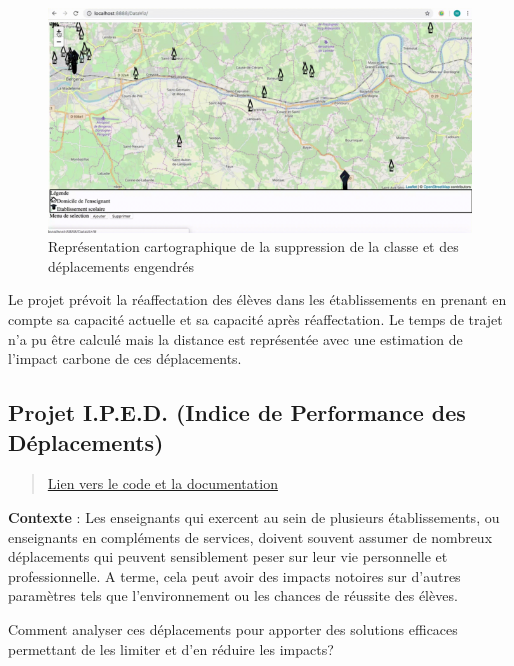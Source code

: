 \documentclass[]{book}
\begin{document}
\begin{figure}

{\centering \includegraphics[width=0.6\linewidth]{./img/locaviz} 

}

\caption{Représentation cartographique de la suppression de la classe et des déplacements engendrés}\label{fig:unnamed-chunk-5}
\end{figure}

Le projet prévoit la réaffectation des élèves dans les établissements en
prenant en compte sa capacité actuelle et sa capacité après
réaffectation. Le temps de trajet n'a pu être calculé mais la distance
est représentée avec une estimation de l'impact carbone de ces
déplacements.

\subsection{Projet I.P.E.D. (Indice de Performance des
Déplacements)}\label{projet-i.p.e.d.-indice-de-performance-des-deplacements}

\begin{quote}
\href{http://datavizchallenge.fr/t/defi-numero-1-indice-annuel-d-evaluation-de-l-impact-mobilite-des-enseignants/131}{Lien
vers le code et la documentation}
\end{quote}

\textbf{Contexte} : Les enseignants qui exercent au sein de plusieurs
établissements, ou enseignants en compléments de services, doivent
souvent assumer de nombreux déplacements qui peuvent sensiblement peser
sur leur vie personnelle et professionnelle. A terme, cela peut avoir
des impacts notoires sur d'autres paramètres tels que l'environnement ou
les chances de réussite des élèves.

Comment analyser ces déplacements pour apporter des solutions efficaces
permettant de les limiter et d'en réduire les impacts?
\end{document}
